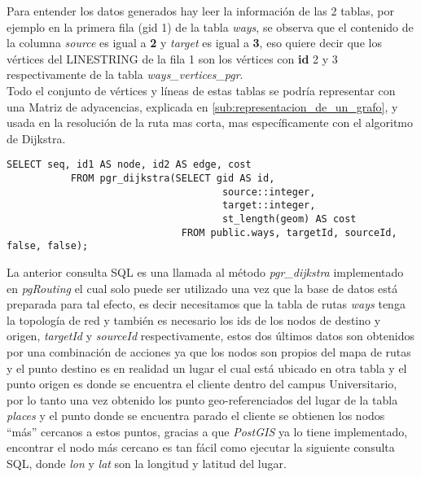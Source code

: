        Para entender los datos generados hay leer la información de las 2 tablas, por ejemplo en la primera  fila (gid 1) de la tabla \emph{ways}, se observa que el contenido de la columna \emph{source} es igual a \textbf{2} y \emph{target} es igual a \textbf{3}, eso quiere decir que los vértices del LINESTRING de la fila 1 son los vértices con \textbf{id} 2 y 3 respectivamente de la tabla \emph{ways\_vertices\_pgr}.\\


       Todo el conjunto de vértices y líneas de estas tablas se podría representar con una Matriz de adyacencias, explicada en \ref{sub:representacion_de_un_grafo}, y usada en la resolución de la ruta mas corta, mas específicamente con el algoritmo de Dijkstra.\\

       \begin{center}
         \begin{lstlisting}[label=pgr_dijkstra,caption=Algoritmo de Dijkstra implementado en \emph{pRouting}]
           SELECT seq, id1 AS node, id2 AS edge, cost
           FROM pgr_dijkstra(SELECT gid AS id,
                                     source::integer,
                                     target::integer,
                                     st_length(geom) AS cost
                              FROM public.ways, targetId, sourceId, false, false);
         \end{lstlisting}
       \end{center}


       La anterior consulta SQL es una llamada al método \emph{pgr\_dijkstra} implementado en \emph{pgRouting} el cual solo puede ser utilizado una vez que la base de datos está preparada para tal efecto, es decir necesitamos que la tabla de rutas \emph{ways} tenga la topología de red y también es necesario los ids de los nodos de destino y origen, \emph{targetId} y \emph{sourceId} respectivamente, estos dos últimos datos son obtenidos por una combinación de acciones ya que los nodos son propios del mapa de rutas y el punto destino es en realidad un lugar el cual está ubicado en otra tabla y el punto origen es donde se encuentra el cliente dentro del campus Universitario, por lo tanto una vez obtenido los punto geo-referenciados del lugar de la tabla \emph{places} y el punto donde se encuentra parado el cliente se obtienen los nodos ``más'' cercanos a estos puntos, gracias a que \emph{PostGIS} ya lo tiene implementado, encontrar el nodo más cercano es tan fácil como ejecutar la siguiente consulta SQL, donde \emph{lon} y \emph{lat} son la longitud y latitud del lugar.

